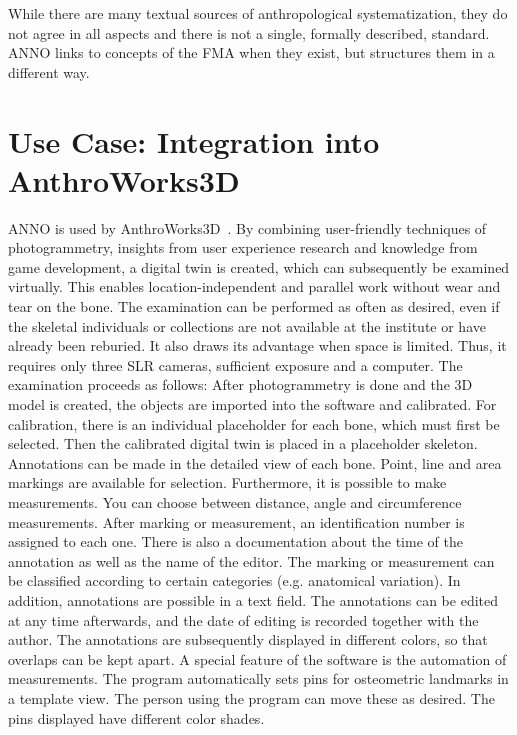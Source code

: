 \documentclass[sw]{iosart2x}
\newcommand{\aw}{AnthroWorks3D}
\begin{document}
While there are many textual sources of anthropological systematization, they do not agree in all aspects and there is not a single, formally described, standard.
ANNO links to concepts of the FMA when they exist, but structures them in a different way.

\section{Use Case: Integration into \aw{}}\label{sec:aw}
ANNO is used by \aw{}~\citep{aw3d}.
By combining user-friendly techniques of photogrammetry, insights from user experience research and knowledge from game development, a digital twin is created, which can subsequently be examined virtually.
This enables location-independent and parallel work without wear and tear on the bone.
The examination can be performed as often as desired, even if the skeletal individuals or collections are not available at the institute or have already been reburied.
It also draws its advantage when space is limited.
Thus, it requires only three SLR cameras, sufficient exposure and a computer.
The examination proceeds as follows: After photogrammetry is done and the 3D model is created, the objects are imported into the software and calibrated.
For calibration, there is an individual placeholder for each bone, which must first be selected.
Then the calibrated digital twin is placed in a placeholder skeleton.
Annotations can be made in the detailed view of each bone.
Point, line and area markings are available for selection.
Furthermore, it is possible to make measurements.
You can choose between distance, angle and circumference measurements.
After marking or measurement, an identification number is assigned to each one.
There is also a documentation about the time of the annotation as well as the name of the editor.
The marking or measurement can be classified according to certain categories (e.g. anatomical variation).
In addition, annotations are possible in a text field.
The annotations can be edited at any time afterwards, and the date of editing is recorded together with the author.
The annotations are subsequently displayed in different colors, so that overlaps can be kept apart.
A special feature of the software is the automation of measurements.
The program automatically sets pins for osteometric landmarks in a template view.
The person using the program can move these as desired.
The pins displayed have different color shades.
\end{document}
